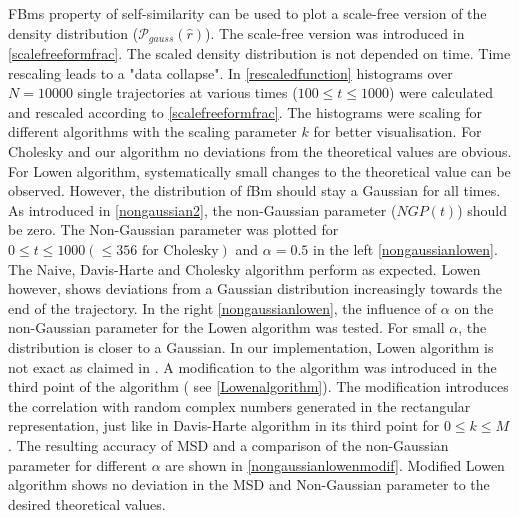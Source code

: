 \documentclass[
  a4paper,BCOR10mm,twoside,
  headsepline,footsepline,%
  fleqn,openbib
]{scrbook}
\begin{document}
FBms property of self-similarity can be used to plot a scale-free version of the density distribution ($\mathcal{P}_{gauss}(\hat{r})$). The scale-free version was introduced in \cref{scalefreeformfrac}. The scaled density distribution is not depended on time. Time rescaling leads to a "data collapse". In \cref{rescaledfunction}  histograms over $N=10000$ single trajectories at various times ($100\leq t \leq 1000$) were calculated and rescaled according to \cref{scalefreeformfrac}. The histograms were scaling for different algorithms with the scaling parameter $k$ for better visualisation. For Cholesky and our algorithm no deviations from the theoretical values are obvious. For Lowen algorithm, systematically small changes to the theoretical value can be observed. However, the distribution of fBm should stay a Gaussian for all times. As introduced in \cref{nongaussian2}, the non-Gaussian parameter ($NGP(t)$) should be zero. The Non-Gaussian parameter was plotted for $0 \leq t \leq 1000 (\leq 356 \text{ for Cholesky})$ and $\alpha=0.5$ in the left  \cref{nongaussianlowen}. The Naive, Davis-Harte and Cholesky algorithm perform as expected. Lowen however, shows deviations from a Gaussian distribution increasingly towards the end of the trajectory. In the right \cref{nongaussianlowen}, the influence of $\alpha$ on the non-Gaussian parameter for the Lowen algorithm was tested. For small $\alpha$, the distribution is closer to a Gaussian. In our implementation, Lowen algorithm is not exact as claimed in \cite{Lowen1999}. A modification to the algorithm  was introduced in the third point  of the algorithm ( see \cref{Lowenalgorithm}). The modification introduces the correlation with random complex numbers generated in the rectangular representation, just like in Davis-Harte algorithm in its third point for $ 0 \leq k \leq M $. The resulting accuracy of MSD and a comparison of the non-Gaussian parameter for different $\alpha$ are shown in \cref{nongaussianlowenmodif}. Modified Lowen algorithm shows no deviation in the MSD and Non-Gaussian parameter to the desired theoretical values.
\end{document}
